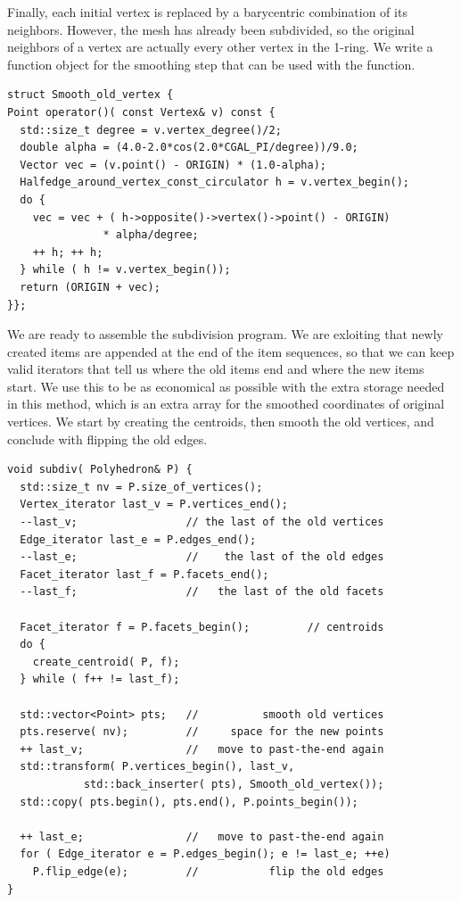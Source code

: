 Finally, each initial vertex is replaced by a barycentric combination
of its neighbors. However, the mesh has already been subdivided, so
the original neighbors of a vertex are actually every other vertex in
the 1-ring. We write a function object for the smoothing step that
can be used with the  function.

\begin{lstlisting}
struct Smooth_old_vertex {
Point operator()( const Vertex& v) const {
  std::size_t degree = v.vertex_degree()/2;
  double alpha = (4.0-2.0*cos(2.0*CGAL_PI/degree))/9.0;
  Vector vec = (v.point() - ORIGIN) * (1.0-alpha);
  Halfedge_around_vertex_const_circulator h = v.vertex_begin();
  do {
    vec = vec + ( h->opposite()->vertex()->point() - ORIGIN) 
               * alpha/degree;
    ++ h; ++ h;
  } while ( h != v.vertex_begin());
  return (ORIGIN + vec);
}};
\end{lstlisting}

We are ready to assemble the subdivision program. We are exloiting
that newly created items are appended at the end of the item
sequences, so that we can keep valid iterators that tell us where the
old items end and where the new items start. We use this to be as
economical as possible with the extra storage needed in this method,
which is an extra array for the smoothed coordinates of original
vertices. We start by creating the centroids, then smooth the old
vertices, and conclude with flipping the old edges.

\begin{lstlisting}
void subdiv( Polyhedron& P) {
  std::size_t nv = P.size_of_vertices();
  Vertex_iterator last_v = P.vertices_end();
  --last_v;                 // the last of the old vertices
  Edge_iterator last_e = P.edges_end();
  --last_e;                 //    the last of the old edges
  Facet_iterator last_f = P.facets_end();
  --last_f;                 //   the last of the old facets

  Facet_iterator f = P.facets_begin();         // centroids
  do {
    create_centroid( P, f);
  } while ( f++ != last_f);

  std::vector<Point> pts;   //          smooth old vertices
  pts.reserve( nv);         //     space for the new points
  ++ last_v;                //   move to past-the-end again
  std::transform( P.vertices_begin(), last_v, 
            std::back_inserter( pts), Smooth_old_vertex());
  std::copy( pts.begin(), pts.end(), P.points_begin());

  ++ last_e;                //   move to past-the-end again
  for ( Edge_iterator e = P.edges_begin(); e != last_e; ++e)
    P.flip_edge(e);         //           flip the old edges
}
\end{lstlisting}

